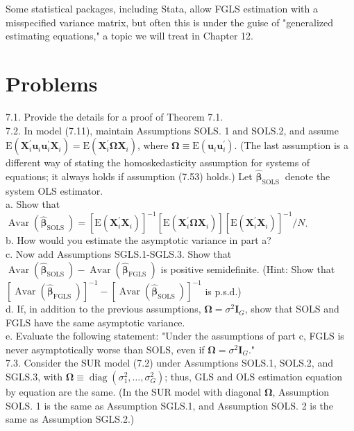 \documentclass[10pt]{article}
\begin{document}
Some statistical packages, including Stata, allow FGLS estimation with a misspecified variance matrix, but often this is under the guise of "generalized estimating equations," a topic we will treat in Chapter 12.

\section*{Problems}
7.1. Provide the details for a proof of Theorem 7.1.\\
7.2. In model (7.11), maintain Assumptions SOLS. 1 and SOLS.2, and assume $\mathrm{E}\left(\mathbf{X}_{i}^{\prime} \mathbf{u}_{i} \mathbf{u}_{i}^{\prime} \mathbf{X}_{i}\right)=\mathrm{E}\left(\mathbf{X}_{i}^{\prime} \boldsymbol{\Omega} \mathbf{X}_{i}\right)$, where $\boldsymbol{\Omega} \equiv \mathrm{E}\left(\mathbf{u}_{i} \mathbf{u}_{i}^{\prime}\right)$. (The last assumption is a different way of stating the homoskedasticity assumption for systems of equations; it always holds if assumption (7.53) holds.) Let $\hat{\boldsymbol{\beta}}_{\text {SOLS }}$ denote the system OLS estimator.\\
a. Show that $\operatorname{Avar}\left(\hat{\boldsymbol{\beta}}_{\text {SOLS }}\right)=\left[\mathrm{E}\left(\mathbf{X}_{i}^{\prime} \mathbf{X}_{i}\right)\right]^{-1}\left[\mathrm{E}\left(\mathbf{X}_{i}^{\prime} \boldsymbol{\Omega} \mathbf{X}_{i}\right)\right]\left[\mathrm{E}\left(\mathbf{X}_{i}^{\prime} \mathbf{X}_{i}\right)\right]^{-1} / N$.\\
b. How would you estimate the asymptotic variance in part a?\\
c. Now add Assumptions SGLS.1-SGLS.3. Show that $\operatorname{Avar}\left(\hat{\boldsymbol{\beta}}_{\text {SOLS }}\right)-\operatorname{Avar}\left(\hat{\boldsymbol{\beta}}_{\text {FGLS }}\right)$ is positive semidefinite. (Hint: Show that $\left[\operatorname{Avar}\left(\hat{\boldsymbol{\beta}}_{\text {FGLS }}\right)\right]^{-1}-\left[\operatorname{Avar}\left(\hat{\boldsymbol{\beta}}_{\text {SOLS }}\right)\right]^{-1}$ is p.s.d.)\\
d. If, in addition to the previous assumptions, $\boldsymbol{\Omega}=\sigma^{2} \mathbf{I}_{G}$, show that SOLS and FGLS have the same asymptotic variance.\\
e. Evaluate the following statement: "Under the assumptions of part c, FGLS is never asymptotically worse than SOLS, even if $\boldsymbol{\Omega}=\sigma^{2} \mathbf{I}_{G}$."\\
7.3. Consider the SUR model (7.2) under Assumptions SOLS.1, SOLS.2, and SGLS.3, with $\boldsymbol{\Omega} \equiv \operatorname{diag}\left(\sigma_{1}^{2}, \ldots, \sigma_{G}^{2}\right)$; thus, GLS and OLS estimation equation by equation are the same. (In the SUR model with diagonal $\boldsymbol{\Omega}$, Assumption SOLS. 1 is the same as Assumption SGLS.1, and Assumption SOLS. 2 is the same as Assumption SGLS.2.)\\
\end{document}
